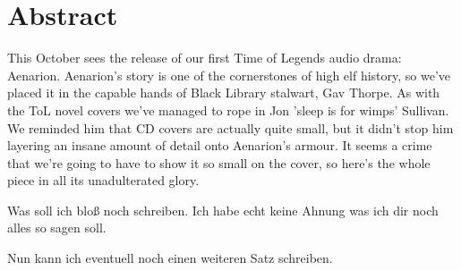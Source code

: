 \begingroup
\newpage
\section*{Abstract}   
This October sees the release of our first Time of Legends audio drama: Aenarion. Aenarion's story is one of the cornerstones of high elf history, so we've placed it in the capable hands of Black Library stalwart, Gav Thorpe. As with the ToL novel covers we've managed to rope in Jon 'sleep is for wimps' Sullivan. We reminded him that CD covers are actually quite small, but it didn't stop him layering an insane amount of detail onto Aenarion's armour. It seems a crime that we're going to have to show it so small on the cover, so here's the whole piece in all its unadulterated glory.

Was soll ich bloß noch schreiben. Ich habe echt keine Ahnung was ich dir noch alles so sagen soll.

Nun kann ich eventuell noch einen weiteren Satz schreiben.
\endgroup


